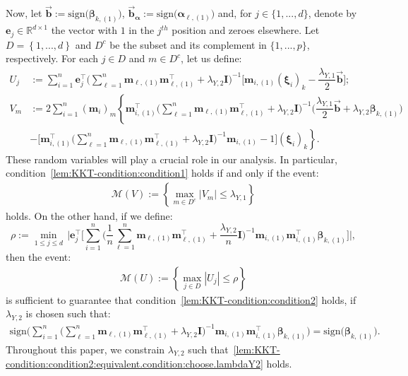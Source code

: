 \documentclass[
  12pt]{article}
\def\R{\mathbb{R}}
\def\M{\mathbf{m}}
\begin{document}
Now, let $\overrightarrow{\mathbf{b}} := \textrm{sign} \big( \bm{\beta}_{k,(1)} \big)$, $\overrightarrow{\mathbf{b}}_{\bm{\alpha}} := \textrm{sign} \big( \bm{\alpha}_{\ell,(1)} \big)$ and, for $j \in \{1, ..., d\}$, denote by $\mathbf{e}_{j} \in \R^{d \times 1}$ the vector with $1$ in the $j^{th}$ position and zeroes elsewhere. Let $D =  \left\{ 1 , ..., d \right\}$ and $D^{c}$ be  the subset and its complement in $\{1, ..., p\}$, respectively. For each $j \in D$ and $m \in D^{c}$, let us define:
\begin{align*}
	U_{j} &:=  \sum_{i = 1}^{n} \mathbf{e}_{j}^{\top} \Big( \sum_{\ell = 1}^{n} \M_{\ell , (1)} \M_{\ell , (1)}^{\top}  +   \lambda_{Y,2} \mathbf{I} \Big)^{-1} \Big[ \M_{i,(1)} (\bm{\xi}_{i})_{k}  -  \dfrac{\lambda_{Y,1}}{2} \overrightarrow{\mathbf{b}}  \Big]   ;
	\\
	V_{m} &:=   2 \sum_{i = 1}^{n} (\M_{i})_{m} \left\{ \M_{i,(1)}^{\top}  \Big( \sum_{\ell = 1}^{n}  \M_{\ell,(1)} \M_{\ell,(1)}^{\top}  + \lambda_{Y,2} \mathbf{I} \Big)^{-1} \Big( \dfrac{\lambda_{Y,1}}{2} \overrightarrow{\mathbf{b}}  +  \lambda_{Y,2} \bm{\beta}_{k , (1)}   \Big)  \right.
	\\
	& \left. - \Big[ \M_{i,(1)}^{\top}  \Big( \sum_{\ell = 1}^{n}  \M_{\ell,(1)} \M_{\ell,(1)}^{\top}  + \lambda_{Y,2} \mathbf{I} \Big)^{-1} \M_{i,(1)}  - 1 \Big]   (\bm{\xi}_{i})_{k}   \right\} .
\end{align*}
These random variables will play a crucial role in our analysis.
In particular, condition~\eqref{lem:KKT-condition:condition1} holds if and only if the event:
\begin{align*}
	\mathcal{M}(V)  :=  \left\{ \max_{m \in D^{c}} |V_{m}| \leq  \lambda_{Y,1}  \right\}
\end{align*}
holds. On the other hand, if we define:   \[
\rho :=  \underset{1 \leq j \leq d}{ \min } \, \Big| \mathbf{e}_{j}^{\top} \Big[ \sum_{i = 1}^{n}   \Big( \dfrac{1}{n} \sum_{\ell = 1}^{n}  \M_{\ell,(1)}  \M_{\ell,(1)}^{\top}  +  \dfrac{\lambda_{Y,2}}{n} \mathbf{I} \Big)^{-1}   \M_{i,(1)}   \M_{i,(1)}^{\top}   \bm{\beta}_{k , (1)}    \Big]  \Big| ,
\]
then the event:
\begin{align}
	\mathcal{M}(U) :=  \left\{ \max_{j \in  D} |U_{j}| \leq   \rho    \right\}
\end{align}
is sufficient to guarantee that condition~\eqref{lem:KKT-condition:condition2} holds,  if $\lambda_{Y,2}$ is chosen such that:
\begin{align}
	\textrm{sign} \Bigg(  \sum_{i=1}^{n} \Big(   \sum_{\ell = 1}^{n}  \M_{\ell,(1)} \M_{\ell,(1)}^{\top}  + \lambda_{Y,2} \mathbf{I} \Big)^{-1}  \M_{i,(1)}   \M_{i,(1)}^{\top}   \bm{\beta}_{k,(1)}   \Bigg)  =  \textrm{sign}\big( \bm{\beta}_{k,(1)} \big).
	\label{lem:KKT-condition:condition2:equivalent.condition:choose.lambdaY2}
\end{align}
Throughout this paper, we constrain $\lambda_{Y,2}$ such that~\eqref{lem:KKT-condition:condition2:equivalent.condition:choose.lambdaY2} holds.
\end{document}
